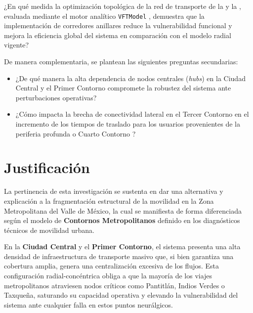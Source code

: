 ¿En qué medida la optimización topológica de la red de transporte de la \cdmx y la \zmvm, 
evaluada mediante el motor analítico \texttt{VFTModel} \textcite{cabrera2026VFTModel}, demuestra que la implementación 
de corredores anillares reduce la vulnerabilidad funcional y mejora la eficiencia global 
del sistema en comparación con el modelo radial vigente?


De manera complementaria, se plantean las siguientes preguntas secundarias:

\begin{itemize}
    \item ¿De qué manera la alta dependencia de nodos centrales (\textit{hubs}) 
    en la Ciudad Central y el Primer Contorno \textcite{semovi2020diagnostico} 
    compromete la robustez del sistema ante perturbaciones operativas?

    \item ¿Cómo impacta la brecha de conectividad lateral en el 
    Tercer Contorno en el incremento de 
    los tiempos de traslado para los usuarios provenientes de 
    la periferia profunda o Cuarto Contorno \textcite{semovi2020diagnostico}?

\end{itemize}

\section{Justificación}
\label{sec:justificacion}

La pertinencia de esta investigación se sustenta en dar una alternativa y explicación a la fragmentación 
estructural de la movilidad en la Zona Metropolitana del Valle de México, la cual se manifiesta de forma 
diferenciada según el modelo de \textbf{Contornos Metropolitanos} definido en los diagnósticos técnicos de movilidad urbana.

En la \textbf{Ciudad Central} y el \textbf{Primer Contorno}, el sistema presenta una alta densidad de infraestructura 
de transporte masivo que, si bien garantiza una cobertura amplia, genera una centralización excesiva de los flujos. 
Esta configuración radial-concéntrica obliga a que la mayoría de los viajes metropolitanos atraviesen nodos 
críticos como Pantitlán, Indios Verdes o Taxqueña, saturando su capacidad operativa y elevando la vulnerabilidad 
del sistema ante cualquier falla en estos puntos neurálgicos.

